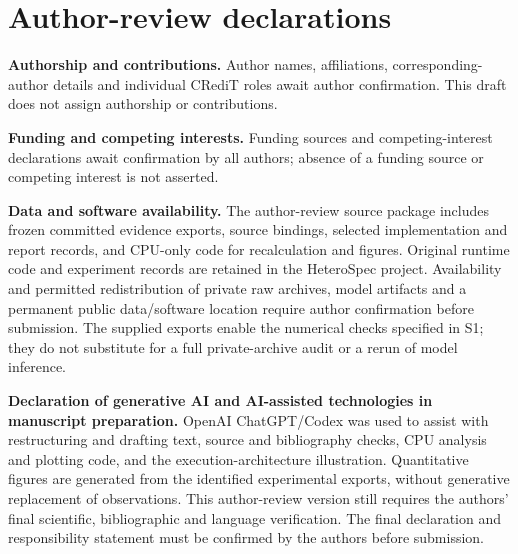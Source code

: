 \section*{Author-review declarations}
\textbf{Authorship and contributions.} Author names, affiliations, corresponding-author details and individual CRediT roles await author confirmation. This draft does not assign authorship or contributions.

\textbf{Funding and competing interests.} Funding sources and competing-interest declarations await confirmation by all authors; absence of a funding source or competing interest is not asserted.

\textbf{Data and software availability.} The author-review source package includes frozen committed evidence exports, source bindings, selected implementation and report records, and CPU-only code for recalculation and figures. Original runtime code and experiment records are retained in the HeteroSpec project. Availability and permitted redistribution of private raw archives, model artifacts and a permanent public data/software location require author confirmation before submission. The supplied exports enable the numerical checks specified in S1; they do not substitute for a full private-archive audit or a rerun of model inference.

\textbf{Declaration of generative AI and AI-assisted technologies in manuscript preparation.} OpenAI ChatGPT/Codex was used to assist with restructuring and drafting text, source and bibliography checks, CPU analysis and plotting code, and the execution-architecture illustration. Quantitative figures are generated from the identified experimental exports, without generative replacement of observations. This author-review version still requires the authors' final scientific, bibliographic and language verification. The final declaration and responsibility statement must be confirmed by the authors before submission.
